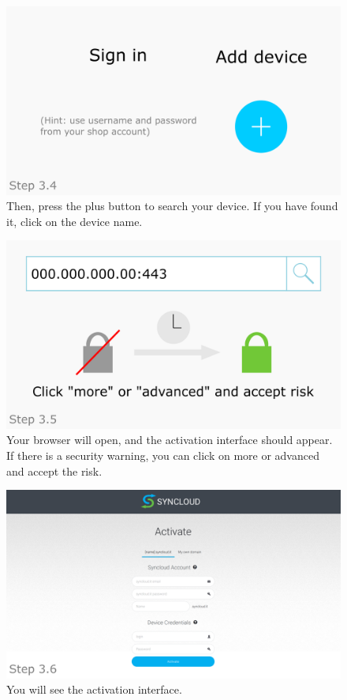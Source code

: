 \documentclass[a4paper,12pt]{article}
\begin{document}
\begin{figure}[htbp!]
	\centering
	\includegraphics[width=0.7\linewidth]{../frames/30.png}
	\caption{Then, press the plus button to search your device. If you have found it, click on the device name.}
	\label{fig:18}
\end{figure}

\begin{figure}[htbp!]
	\centering
	\includegraphics[width=0.7\linewidth]{../frames/31.png}
	\caption{Your browser will open, and the activation interface should appear. If there is a security warning, you can click on more or advanced and accept the risk.}
	\label{fig:19}
\end{figure}

\begin{figure}[htbp!]
	\centering
	\includegraphics[width=0.7\linewidth]{../frames/32.png}
	\caption{You will see the activation interface.}
	\label{fig:20}
\end{figure}
\end{document}
